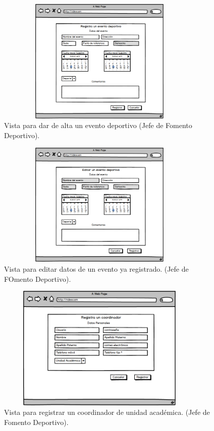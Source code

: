 		\begin{figure} [hbt!]
			\centering
			\includegraphics[width=10cm, height=6cm]{Imagenes/Nuevos/P4_Crear_evento_deportivo}
			\caption{Vista para dar de alta un evento deportivo (Jefe de Fomento Deportivo).}
			\label{creaevento}
		\end{figure}
		
		\pagebreak	
		
		\begin{figure} [hbt!]
			\centering
			\includegraphics[width=10cm, height=6cm]{Imagenes/Nuevos/P5_Editar_evento_deportivo}
			\caption{Vista para editar datos de un evento ya registrado. (Jefe de FOmento Deportivo).}
			\label{editarevento}
		\end{figure}
	
		\begin{figure} [hbt!]
			\centering
			\includegraphics[width=10cm, height=6cm]{Imagenes/Nuevos/P6_Registro_coordinador}
			\caption{Vista para registrar un coordinador de unidad académica. (Jefe de Fomento Deportivo).}
			\label{registrarcoord}
		\end{figure}
		
